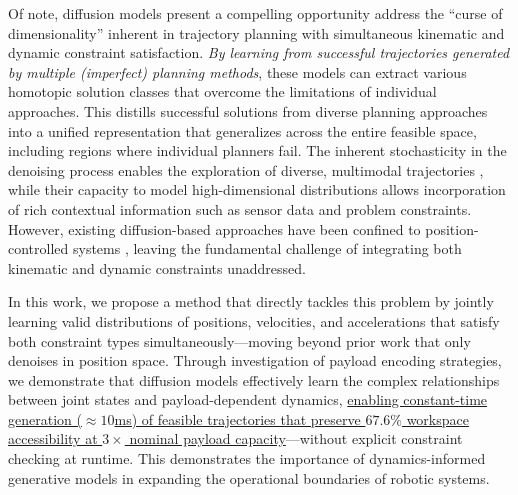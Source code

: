 Of note, diffusion models \cite{chi2023diffusionpolicy,sridhar2024nomad} present a compelling opportunity
address the ``curse of dimensionality'' inherent in trajectory planning with simultaneous kinematic and dynamic constraint satisfaction.
\textit{By learning from successful trajectories generated by multiple (imperfect) planning methods}, these models can extract various homotopic solution classes that overcome the limitations of individual approaches.
This distills successful solutions from diverse planning approaches into a unified representation that generalizes across the entire feasible space, including regions where individual planners fail.
The inherent stochasticity in the denoising process enables the exploration of diverse, multimodal trajectories \cite{chi2023diffusionpolicy}, while their capacity to model high-dimensional distributions allows incorporation of rich contextual information such as sensor data and problem constraints.
However, existing diffusion-based approaches have been confined to position-controlled systems \cite{carvalho2023motion,saha2024edmp}, leaving the fundamental challenge of integrating both kinematic and dynamic constraints unaddressed.

In this work, we propose a method that directly tackles this problem by jointly learning valid distributions of positions, velocities, and accelerations that satisfy both constraint types simultaneously---moving beyond prior work that only denoises in position space.
Through investigation of payload encoding strategies, we demonstrate that diffusion models effectively learn the complex relationships between joint states and payload-dependent dynamics, \uline{enabling constant-time generation ($\approx 10$ms) of feasible trajectories that preserve $67.6\%$ workspace accessibility at $3\times$ nominal payload capacity}---without explicit constraint checking at runtime. This demonstrates the importance of dynamics-informed generative models in expanding the operational boundaries of robotic systems.